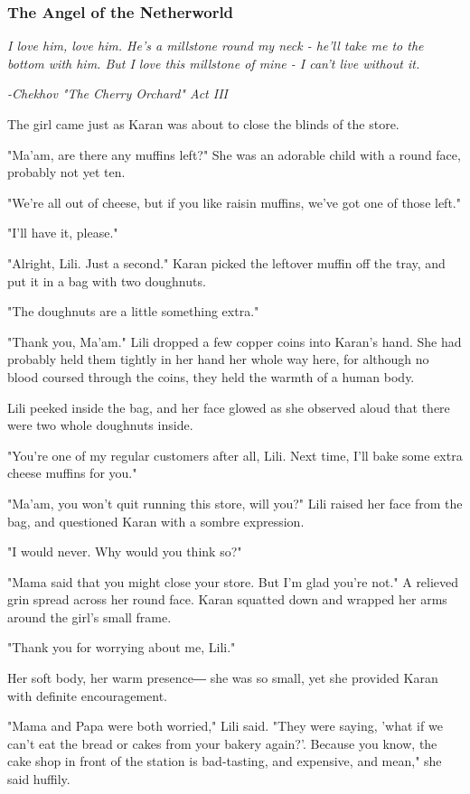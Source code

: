 \subsubsection{The Angel of the Netherworld}

\emph{I love him, love him. He's a millstone round my neck - he'll take
me to the bottom with him. But I love this millstone of mine - I can't
live without it.}

\emph{-Chekhov "The Cherry Orchard" Act III}

The girl came just as Karan was about to close the blinds of the store.

"Ma'am, are there any muffins left?" She was an adorable child with a
round face, probably not yet ten.

"We're all out of cheese, but if you like raisin muffins, we've got one
of those left."

"I'll have it, please."

"Alright, Lili. Just a second." Karan picked the leftover muffin off the
tray, and put it in a bag with two doughnuts.

"The doughnuts are a little something extra."

"Thank you, Ma'am." Lili dropped a few copper coins into Karan's hand.
She had probably held them tightly in her hand her whole way here, for
although no blood coursed through the coins, they held the warmth of a
human body.

Lili peeked inside the bag, and her face glowed as she observed aloud
that there were two whole doughnuts inside.

"You're one of my regular customers after all, Lili. Next time, I'll
bake some extra cheese muffins for you."

"Ma'am, you won't quit running this store, will you?" Lili raised her
face from the bag, and questioned Karan with a sombre expression.

"I would never. Why would you think so?"

"Mama said that you might close your store. But I'm glad you're not." A
relieved grin spread across her round face. Karan squatted down and
wrapped her arms around the girl's small frame.

"Thank you for worrying about me, Lili."

Her soft body, her warm presence― she was so small, yet she provided
Karan with definite encouragement.

"Mama and Papa were both worried," Lili said. "They were saying, 'what
if we can't eat the bread or cakes from your bakery again?'. Because you
know, the cake shop in front of the station is bad-tasting, and
expensive, and mean," she said huffily.

